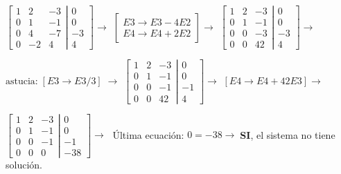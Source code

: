 \begin{proofw}
 \noindent  $\left[ \begin{matrix}
  1 & 2 & -3 \\ 0 & 1 & -1 \\ 0 & 4 & -7 \\ 0 & -2 & 4  
 \end{matrix}\right. 
 \left| \begin{matrix}
  0 \\ 0 \\ -3 \\ 4
 \end{matrix}\right] \to $ \textcolor{gris}{$\left[ \begin{matrix}  E3 \to E3-4E2 \\ E4 \to E4+2E2 \end{matrix} \right] \to $}
 $\left[ \begin{matrix}
  1 & 2 & -3 \\ 0 & 1 & -1 \\ 0 & 0 & -3 \\ 0 & 0 & 42  
 \end{matrix}\right. 
 \left| \begin{matrix}
  0 \\ 0 \\ -3 \\ 4
 \end{matrix}\right] \to $ 
  
 \noindent \textcolor{gris}{$  \text{astucia:} \; [E3 \to E3/3]\; \to $}  $\left[ \begin{matrix}
  1 & 2 & -3 \\ 0 & 1 & -1 \\ 0 & 0 & -1 \\ 0 & 0 & 42  
 \end{matrix}\right. 
 \left| \begin{matrix}
  0 \\ 0 \\ -1 \\ 4
 \end{matrix}\right] \to $ \textcolor{gris}{$[E4 \to E4+42E3] \to $}
 
 \noindent  $\left[ \begin{matrix}
  1 & 2 & -3 \\ 0 & 1 & -1 \\ 0 & 0 & -1 \\ 0 & 0 & 0  
 \end{matrix}\right. 
 \left| \begin{matrix}
  0 \\ 0 \\ -1 \\ -38
 \end{matrix}\right] \to \; $ Última ecuación: $0=-38 \to \; $\textbf{SI}, el sistema no tiene solución.
\end{proofw}


